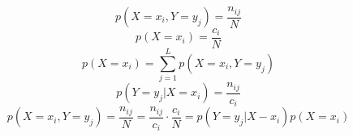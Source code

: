 $$p(X=x_{i},Y=y_{j})=\frac{n_{ij}}{N}$$
$$p(X=x_{i})=\frac{c_{i}}{N}$$
$$p(X=x_{i})=\sum_{j=1}^{L}p(X=x_{i},Y=y_j)$$
$$p(Y=y_j |X=x_i )=\frac{n_{ij}}{c_i}$$
$$p(X=x_i,Y=y_j)=\frac{n_{ij}}{N}=\frac{n_{ij}}{c_i}\cdot\frac{c_i}{N}
=p(Y=y_j|X-x_i)p(X=x_i)$$
